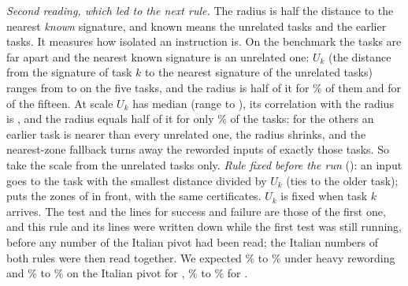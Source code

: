 \emph{Second reading, which led to the next rule.} The radius is half the distance to the nearest \emph{known} signature, and known means the unrelated tasks and the earlier tasks. It measures how isolated an instruction is. On the benchmark the tasks are far apart and the nearest known signature is an unrelated one: $U_k$ (the distance from the signature of task $k$ to the nearest signature of the unrelated tasks) ranges from \RerouteBBenchFiveMin{} to \RerouteBBenchFiveMax{} on the five tasks, and the radius is half of it for \RerouteBBenchFiveShare{}\% of them and for \RerouteBBenchFifteenCount{} of the fifteen.
At scale $U_k$ has median \RerouteBMedian{} (range \RerouteBMin{} to \RerouteBMax{}), its correlation with the radius is \RerouteBCorr{}, and the radius equals half of it for only \RerouteBShare{}\% of the \WidenTasksEval{} tasks: for the others an earlier task is nearer than every unrelated one, the radius shrinks, and the nearest-zone fallback turns away the reworded inputs of exactly those tasks. So take the scale from the unrelated tasks only. \emph{Rule fixed before the run} (\scaled{}): an input goes to the task with the smallest distance divided by $U_k$ (ties to the older task);
\certscaled{} puts the zones of \cert{} in front, with the same certificates. $U_k$ is fixed when task $k$ arrives. The test and the lines for success and failure are those of the first one, and this rule and its lines were written down while the first test was still running, before any number of the Italian pivot had been read; the Italian numbers of both rules were then read together. We expected \RerouteExpectBgHeavyLow{}\% to \RerouteExpectBgHeavyHigh{}\% under heavy rewording and \RerouteExpectBgItLow{}\% to \RerouteExpectBgItHigh{}\% on the Italian pivot for \scaled{}, \RerouteExpectCfItLow{}\% to \RerouteExpectCfItHigh{}\% for \certscaled{}.


